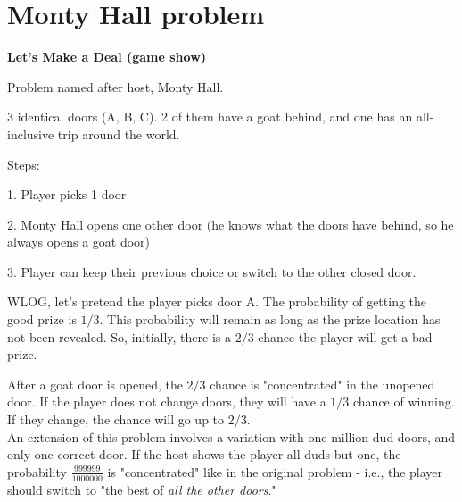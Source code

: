 \documentclass[english]{exam}
\begin{document}
	
    \section{Monty Hall problem}
    
    \textbf{Let's Make a Deal (game show)}
    
    Problem named after host, Monty Hall.
    
    3 identical doors (A, B, C). 2 of them have a goat behind, and one has an all-inclusive trip around the world.
    
    Steps:
    
    1. Player picks 1 door
    
    2. Monty Hall opens one other door (he knows what the doors have behind, so he always opens a goat door)
    
    3. Player can keep their previous choice or switch to the other closed door.
    
    WLOG, let's pretend the player picks door A. The probability of getting the good prize is $1/3$. This probability will remain as long as the prize location has not been revealed. So, initially, there is a $2/3$ chance the player will get a bad prize. 
    
    After a goat door is opened, the $2/3$ chance is "concentrated" in the unopened door. If the player does not change doors, they will have a $1/3$ chance of winning. If they change, the chance will go up to $2/3$.\\
    
    An extension of this problem involves a variation with one million dud doors, and only one correct door. If the host shows the player all duds but one, the probability $\frac{999999}{1000000}$ is "concentrated" like in the original problem - i.e., the player should switch to "the best of \textit{all the other doors}."
    
    
    
    
    
    
\end{document}
